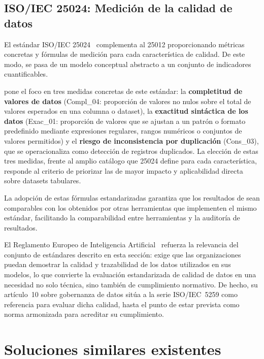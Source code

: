 \subsection{\ac{ISO}/\ac{IEC} 25024: Medición de la calidad de datos}
\label{sec:iso25024}

El estándar \ac{ISO}/\ac{IEC} 25024~\citep{iso25024} complementa al 25012
proporcionando métricas concretas y fórmulas de medición para cada
característica de calidad. De este modo, se pasa de un modelo conceptual
abstracto a un conjunto de indicadores cuantificables.

\dataqual pone el foco en tres medidas concretas de este estándar: la
\textbf{completitud de valores de datos} (Compl\_04: proporción de valores no
nulos sobre el total de valores esperados en una columna o dataset), la
\textbf{exactitud sintáctica de los datos} (Exac\_01: proporción de valores
que se ajustan a un patrón o formato predefinido mediante expresiones
regulares, rangos numéricos o conjuntos de valores permitidos) y el
\textbf{riesgo de inconsistencia por duplicación} (Cons\_03), que se
operacionaliza como detección de registros duplicados. La elección de estas
tres medidas, frente al amplio catálogo que 25024 define para cada
característica, responde al criterio de priorizar las de mayor impacto y
aplicabilidad directa sobre datasets tabulares.

La adopción de estas fórmulas estandarizadas garantiza que los resultados de
\dataqual sean comparables con los obtenidos por otras herramientas que
implementen el mismo estándar, facilitando la comparabilidad entre
herramientas y la auditoría de resultados.

El Reglamento Europeo de Inteligencia Artificial~\citep{aiact2024} refuerza
la relevancia del conjunto de estándares descrito en esta sección: exige que
las organizaciones puedan demostrar la calidad y trazabilidad de los datos
utilizados en sus modelos, lo que convierte la evaluación estandarizada de
calidad de datos en una necesidad no solo técnica, sino también de
cumplimiento normativo. De hecho, su artículo~10 sobre gobernanza de datos
sitúa a la serie \ac{ISO}/\ac{IEC}~5259 como referencia para evaluar dicha
calidad, hasta el punto de estar prevista como norma armonizada para acreditar
su cumplimiento.


\section{Soluciones similares existentes}
\label{sec:estado-arte}

